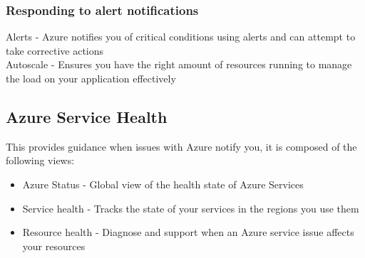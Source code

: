 \documentclass{article}[18pt]
\begin{document}
\subsubsection{Responding to alert notifications}
Alerts - Azure notifies you of critical conditions using alerts and can attempt to take corrective actions\\
Autoscale - Ensures you have the right amount of resources running to manage the load on your application effectively
\subsection{Azure Service Health}
This provides guidance when issues with Azure notify you, it is composed of the following views:
\begin{itemize}
	\item Azure Status - Global view of the health state of Azure Services
	\item Service health - Tracks the state of your services in the regions you use them
	\item Resource health - Diagnose and support when an Azure service issue affects your resources
\end{itemize}
\end{document}
